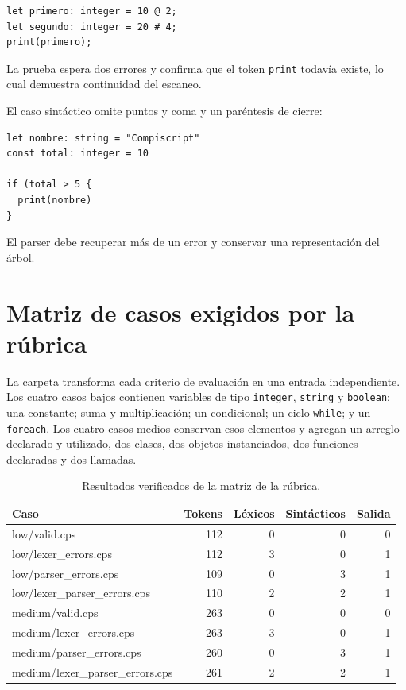 \documentclass[12pt,letterpaper,oneside]{report}
\newcommand{\archivo}[1]{\texttt{#1}}
\begin{document}
\begin{verbatim}
let primero: integer = 10 @ 2;
let segundo: integer = 20 # 4;
print(primero);
\end{verbatim}

La prueba espera dos errores y confirma que el token \archivo{print} todavía existe,
lo cual demuestra continuidad del escaneo.

El caso sintáctico omite puntos y coma y un paréntesis de cierre:

\begin{verbatim}
let nombre: string = "Compiscript"
const total: integer = 10

if (total > 5 {
  print(nombre)
}
\end{verbatim}

El parser debe recuperar más de un error y conservar una representación del árbol.

\section{Matriz de casos exigidos por la rúbrica}

La carpeta  transforma cada criterio de evaluación en una
entrada independiente. Los cuatro casos bajos contienen variables de tipo
\archivo{integer}, \archivo{string} y \archivo{boolean}; una constante; suma y
multiplicación; un condicional; un ciclo \archivo{while}; y un \archivo{foreach}.
Los cuatro casos medios conservan esos elementos y agregan un arreglo declarado y
utilizado, dos clases, dos objetos instanciados, dos funciones declaradas y dos
llamadas.

\begin{table}[H]
\centering
\caption{Resultados verificados de la matriz de la rúbrica.}
\label{tab:matriz-rubrica}
\begin{tabularx}{\textwidth}{>{\ttfamily}X r r r r}
\toprule
\normalfont Caso & Tokens & Léxicos & Sintácticos & Salida \\
\midrule
low/valid.cps & 112 & 0 & 0 & 0 \\
low/lexer\_errors.cps & 112 & 3 & 0 & 1 \\
low/parser\_errors.cps & 109 & 0 & 3 & 1 \\
low/lexer\_parser\_errors.cps & 110 & 2 & 2 & 1 \\
medium/valid.cps & 263 & 0 & 0 & 0 \\
medium/lexer\_errors.cps & 263 & 3 & 0 & 1 \\
medium/parser\_errors.cps & 260 & 0 & 3 & 1 \\
medium/lexer\_parser\_errors.cps & 261 & 2 & 2 & 1 \\
\bottomrule
\end{tabularx}
\end{table}
\end{document}
